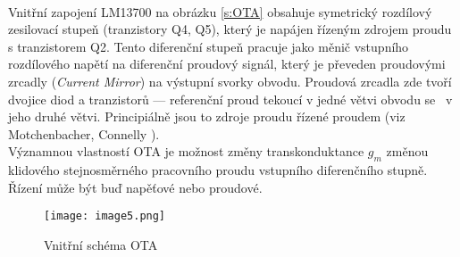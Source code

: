 \\
\noindent Vnitřní zapojení LM13700 na obrázku \ref{s:OTA} obsahuje symetrický rozdílový zesilovací stupeň (tranzistory Q4, Q5), který je napájen řízeným zdrojem proudu s tranzistorem Q2. Tento diferenční stupeň pracuje jako měnič vstupního rozdílového napětí na diferenční proudový signál, který je převeden proudovými zrcadly (\textit{Current Mirror}) na výstupní svorky obvodu. Proudová zrcadla zde tvoří dvojice diod a tranzistorů --- referenční proud tekoucí v jedné větvi obvodu se  ~v jeho druhé větvi. Principiálně jsou to zdroje proudu řízené proudem (viz Motchenbacher, Connelly \cite{21}).
\\
\noindent Významnou vlastností OTA je možnost změny transkonduktance $g_m$ změnou klidového stejnosměrného pracovního proudu vstupního diferenčního stupně. Řízení může být buď napěťové nebo proudové.
\begin{figure}[h]
\centering
\texttt{[image: image5.png]}
\caption[Vnitřní schéma OTA]{Vnitřní schéma OTA \cite{20}\label{sec:OTA}}
\end{figure}